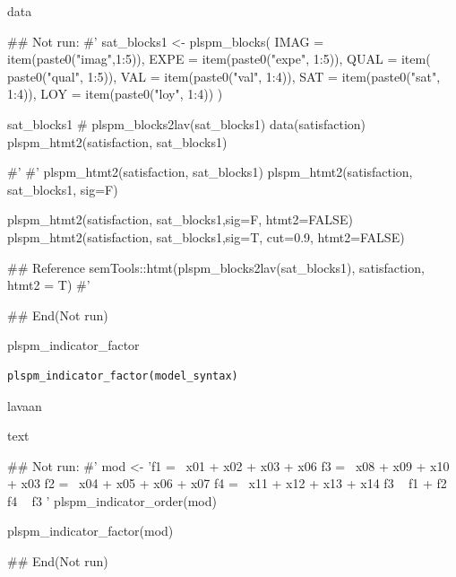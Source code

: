 \documentclass[a4paper]{book}
\begin{document}
%
\begin{Value}
data
\end{Value}
%
\begin{Examples}
\begin{ExampleCode}

\#\# Not run: 
#'
sat_blocks1 <- plspm_blocks(
  IMAG = item(paste0("imag",1:5)),
  EXPE = item(paste0("expe", 1:5)),
  QUAL = item( paste0("qual", 1:5)),
  VAL = item(paste0("val", 1:4)),
  SAT = item(paste0("sat", 1:4)),
  LOY = item(paste0("loy", 1:4))
)

sat_blocks1
# plspm_blocks2lav(sat_blocks1) %
data(satisfaction)
plspm_htmt2(satisfaction, sat_blocks1)

#'
#'
plspm_htmt2(satisfaction, sat_blocks1)
plspm_htmt2(satisfaction, sat_blocks1, sig=F)

plspm_htmt2(satisfaction, sat_blocks1,sig=F, htmt2=FALSE)
plspm_htmt2(satisfaction, sat_blocks1,sig=T, cut=0.9, htmt2=FALSE)

## Reference
semTools::htmt(plspm_blocks2lav(sat_blocks1),
               satisfaction,
               htmt2 = T)
#'


## End(Not run)

\end{ExampleCode}
\end{Examples}
%
\begin{Description}
plspm\_indicator\_factor
\end{Description}
%
\begin{Usage}
\begin{verbatim}
plspm_indicator_factor(model_syntax)
\end{verbatim}
\end{Usage}
%
\begin{Arguments}
\begin{ldescription}
\item[\code{model\_syntax}] lavaan
\end{ldescription}
\end{Arguments}
%
\begin{Value}
text
\end{Value}
%
\begin{Examples}
\begin{ExampleCode}

\#\# Not run: 
#'
mod <-
  'f1 =~ x01 + x02 + x03 + x06
    f3 =~ x08 + x09 + x10 + x03
    f2 =~ x04 + x05 + x06 + x07
    f4 =~ x11 + x12 + x13 + x14
    f3 ~ f1 + f2
    f4 ~ f3
   '
plspm_indicator_order(mod)

plspm_indicator_factor(mod)

## End(Not run)

\end{ExampleCode}
\end{Examples}
\end{document}
